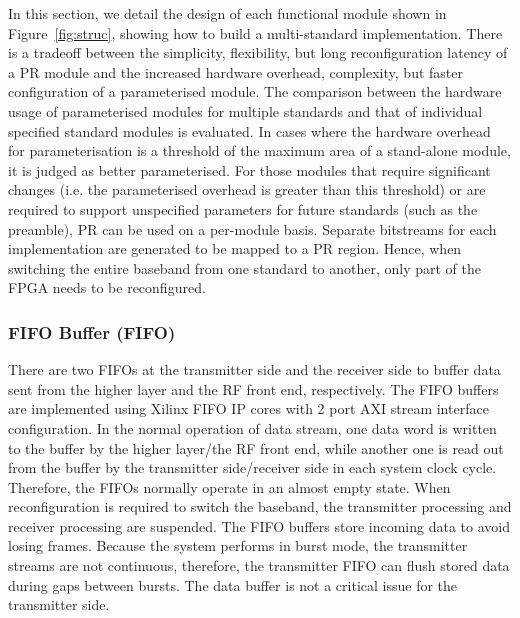 In this section, we detail the design of each functional module shown in Figure~\ref{fig:struc}, showing how to build a multi-standard implementation.
There is a tradeoff between the simplicity, flexibility, but long reconfiguration latency of a PR module and the increased hardware overhead, complexity, but faster configuration of a parameterised module.
The comparison between the hardware usage of parameterised modules for multiple standards and that of individual specified standard modules is evaluated.
In cases where the hardware overhead for parameterisation is a threshold of the maximum area of a stand-alone module, it is judged as better parameterised.
For those modules that require significant changes (i.e. the parameterised overhead is greater than this threshold) or are required to support unspecified parameters for future standards (such as the preamble), PR can be used on a per-module basis.
Separate bitstreams for each implementation are generated to be mapped to a PR region.
Hence, when switching the entire baseband from one standard to another, only part of the FPGA needs to be reconfigured.

\subsubsection{FIFO Buffer (FIFO)}
There are two FIFOs at the transmitter side and the receiver side to buffer data sent from the higher layer and the RF front end, respectively.
The FIFO buffers are implemented using Xilinx FIFO IP cores with 2 port AXI stream interface configuration.
In the normal operation of data stream, one data word is written to the buffer by the higher layer/the RF front end, while another one is read out from the buffer by the transmitter side/receiver side in each system clock cycle.
Therefore, the FIFOs normally operate in an almost empty state.
When reconfiguration is required to switch the baseband, the transmitter processing and receiver processing are suspended.
The FIFO buffers store incoming data to avoid losing frames.
Because the system performs in burst mode, the transmitter streams are not continuous, therefore, the transmitter FIFO can flush stored data during  gaps between bursts.
The data buffer is not a critical issue for the transmitter side.

